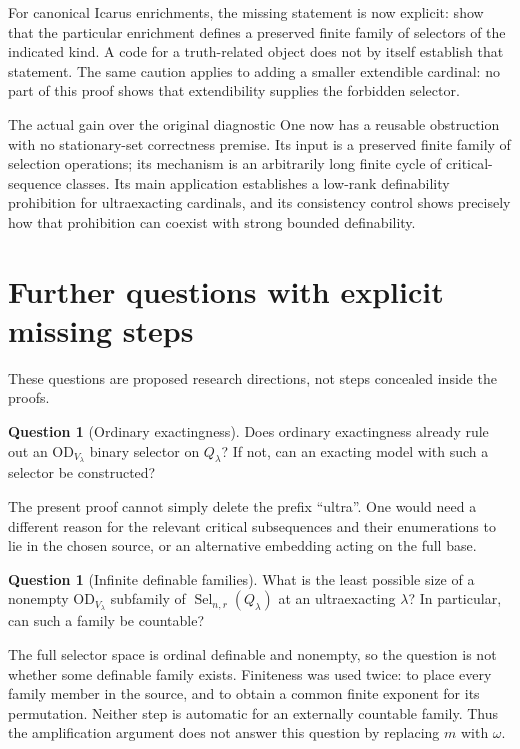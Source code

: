 \documentclass[11pt,letterpaper]{article}
\theoremstyle{definition}
\newcommand{\OD}{\mathrm{OD}}
\newcommand{\Sel}{\operatorname{Sel}}
\newtheorem{question}[definition]{Question}
\begin{document}
For canonical Icarus enrichments, the missing statement is now explicit: show that the particular enrichment defines a preserved finite family of selectors of the indicated kind. A code for a truth-related object does not by itself establish that statement. The same caution applies to adding a smaller extendible cardinal: no part of this proof shows that extendibility supplies the forbidden selector.

\begin{assessment}{The actual gain over the original diagnostic}
One now has a reusable obstruction with no stationary-set correctness premise. Its input is a preserved finite family of selection operations; its mechanism is an arbitrarily long finite cycle of critical-sequence classes. Its main application establishes a low-rank definability prohibition for ultraexacting cardinals, and its consistency control shows precisely how that prohibition can coexist with strong bounded definability.
\end{assessment}

\section{Further questions with explicit missing steps}\label{sec:questions}

These questions are proposed research directions, not steps concealed inside the proofs.

\begin{question}[Ordinary exactingness]
Does ordinary exactingness already rule out an $\OD_{V_\lambda}$ binary selector on $Q_\lambda$? If not, can an exacting model with such a selector be constructed?
\end{question}

The present proof cannot simply delete the prefix ``ultra''. One would need a different reason for the relevant critical subsequences and their enumerations to lie in the chosen source, or an alternative embedding acting on the full base.

\begin{question}[Infinite definable families]
What is the least possible size of a nonempty $\OD_{V_\lambda}$ subfamily of $\Sel_{n,r}(Q_\lambda)$ at an ultraexacting $\lambda$? In particular, can such a family be countable?
\end{question}

The full selector space is ordinal definable and nonempty, so the question is not whether some definable family exists. Finiteness was used twice: to place every family member in the source, and to obtain a common finite exponent for its permutation. Neither step is automatic for an externally countable family. Thus the amplification argument does not answer this question by replacing $m$ with $\omega$.
\end{document}
